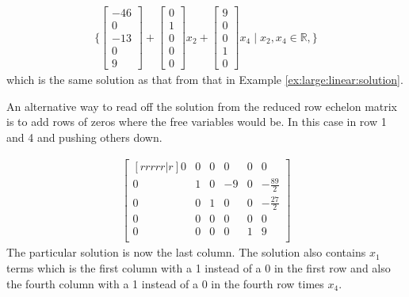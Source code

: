 \begin{example}
\begin{align*}
\{ \begin{bmatrix}
-46 \\
0 \\
-13 \\
0 \\
9
\end{bmatrix} + 
\begin{bmatrix}
0 \\ 1 \\ 0 \\ 0 \\ 0 
\end{bmatrix} x_2 + \begin{bmatrix}
9 \\ 0 \\ 0 \\ 1 \\ 0
\end{bmatrix} x_4 \; | \; x_2, x_4 \in \mathbb{R}, \} 
\end{align*}
which is the same solution as that from that in Example \ref{ex:large:linear:solution}.  

An alternative way to read off the solution from the reduced row echelon matrix is to add rows of zeros where the free variables would be.  In this case in row 1 and 4 and pushing others down. 

\begin{align*}
\begin{bmatrix}[rrrrr|r]
0 & 0 & 0 & 0 & 0 & 0 \\
0 & 1 & 0 & -9 & 0 & -\frac{89}{2} \\
0 & 0 & 1 & 0 & 0 & -\frac{27}{2} \\
0 & 0 & 0 & 0 & 0 & 0 \\
0 & 0 & 0 & 0 & 1 & 9 \\
\end{bmatrix}
\end{align*}
The particular solution is now the last column.  The solution also contains $x_1$ terms which is the first column with a 1 instead of a 0 in the first row and also the fourth column with a 1 instead of a 0 in the fourth row times $x_4$.  

\end{example}

~

\phantom{Empty sTff}


